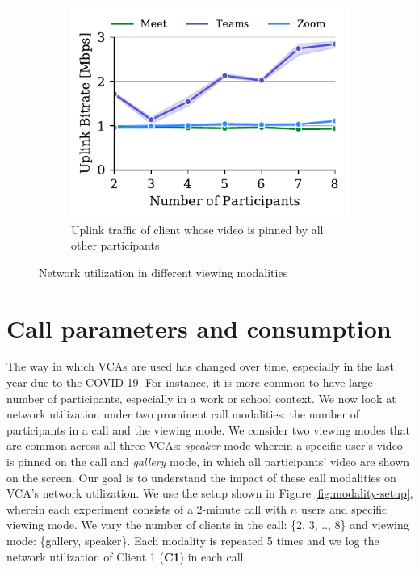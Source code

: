 \begin{figure}[ht]
\begin{subfigure}[t]{.33\textwidth}
    \label{fig:gallery-send}
\end{subfigure}
\hfill
\begin{subfigure}[t]{.33\textwidth}
  \centering
   \captionsetup{width=.9\linewidth}
    \includegraphics[width=1\textwidth,keepaspectratio]{../figures/modality/speaker_send.pdf}
    \caption{Uplink traffic of client whose video is pinned by all other participants}
    \label{fig:speaker-send}
\end{subfigure}
\caption{Network utilization in different viewing modalities}
\label{fig:viewing-mode}
\end{figure}

\section{Call parameters and 
consumption}\label{sec:usage_modality}






The way in which VCAs are used has changed over time, especially in the last year due to the COVID-19. For instance, it is more common to have large number of participants, especially in a work or school context. We now look at network utilization under two prominent call modalities: the number of participants in a call and the viewing mode. We consider two viewing modes that are common across all three VCAs: \textit{speaker} mode wherein a specific user's video is pinned on the call and \textit{gallery} mode, in which all participants' video are shown on the screen. Our goal is to understand the impact of these call modalities on VCA's network utilization. We use the setup shown in Figure \ref{fig:modality-setup}, wherein each experiment consists of a 2-minute call with $n$ users and specific viewing mode. We vary the number of clients in the call: \{2, 3, .., 8\} and viewing mode: \{gallery, speaker\}. Each modality is repeated 5 times and we log the network utilization of Client 1 (\textbf{C1}) in each call. 


